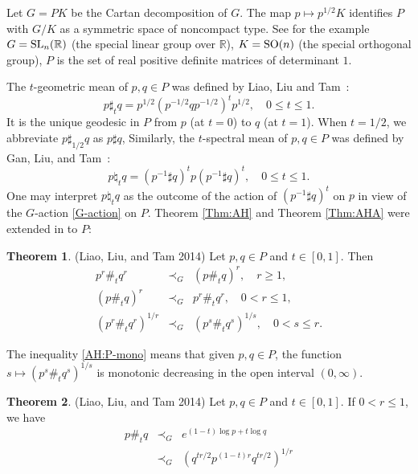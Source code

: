 \documentclass[12pt, reqno]{amsart}
\numberwithin{equation}{section}
\theoremstyle{definition}
\newtheorem{theorem}{Theorem}[section]
\renewcommand{\ge}{\geqslant}
\renewcommand{\le}{\leqslant}
\def\SO{{\rm SO}}
\def\SL{{\rm SL}}
\def\R{\mathbb R}
\begin{document}
Let $G = PK$ be the Cartan decomposition of $G$. The map $p \mapsto p^{1/2}K$ {identifies} $P$ with $G/K$ as a symmetric space of noncompact type.  See \cite [p.349-350]{T16} for the example $G = \SL_n(\R)$ (the special linear group over $\R$), $K=\SO(n)$ (the special orthogonal group), $P$ is the set of real positive definite matrices of determinant $1$. 

The $t$-geometric mean of $p, q \in P$ was defined by Liao, Liu and Tam~\cite{LLT14}:
\begin{equation}\label{P:t-geometric mean}
p \sharp_{t}q = p^{1/2}\left(p^{-1/2}qp^{-1/2}\right)^{t}p^{1/2}, \quad 0 \le t \le 1.
\end{equation}
It is the unique geodesic in $P$ from $p$ (at $t=0$) to $q$ (at $t=1$). 
When $t = 1/2$, we abbreviate $p \sharp_{1/2} q$ as $p \sharp q$, 
Similarly, the $t$-spectral mean of $p, q \in P$ was defined by Gan, Liu, and Tam~\cite {GLT21}: 
\[
p \natural_t q = (p^{-1} \sharp q)^{t} p (p^{-1} \sharp q)^{t}, \quad 0 \le t \le 1.
\]
One may interpret  $p \natural_t q$ as the outcome of the action of $(p^{-1} \sharp q)^{t}$ on $p$ in view of the $G$-action \eqref{G-action} on $P$. 
Theorem \ref{Thm:AH} and Theorem \ref{Thm:AHA} were extended in  \cite [Theorem 3.6 and Theorem 3.5, respectively]{LLT14} to $P$:
\begin{theorem} (Liao, Liu, and Tam 2014)
Let $p,q \in P$ and $t \in [0, 1]$. Then 
\begin{eqnarray}
p^r\#_tq^r &\prec_G& (p\#_tq)^r, \quad r \ge 1,  \label{AH:P-r>1}\\
(p\#_tq)^r &\prec_G& p^r\#_tq^r, \quad 0 <  r \le 1,\label{AH:P-r<1} \\
(p^r\#_t q^r)^{1/r} &\prec_G & (p^s\#_t q^s)^{1/s},\quad 0<s\le r.\label{AH:P-mono}
\end{eqnarray}
\end{theorem}
The inequality \eqref{AH:P-mono} means that given $p,q\in P$, the function $s\mapsto (p^s\#_t q^s)^{1/s}$ is monotonic decreasing in the open interval $(0,\infty)$.

\begin{theorem} (Liao, Liu, and Tam 2014)
Let $p, q \in P$ and $t \in [0, 1]$. If $0 < r \le 1$, we have
\begin{eqnarray*}
p\#_{t}q &\prec_G  &e^{(1-t)  \log p + t \log q} \\
               &\prec_G  & (q^{tr/2}p^{(1-t)r}q^{tr/2})^{1/r}  
\end{eqnarray*}
\end{theorem}
\end{document}
